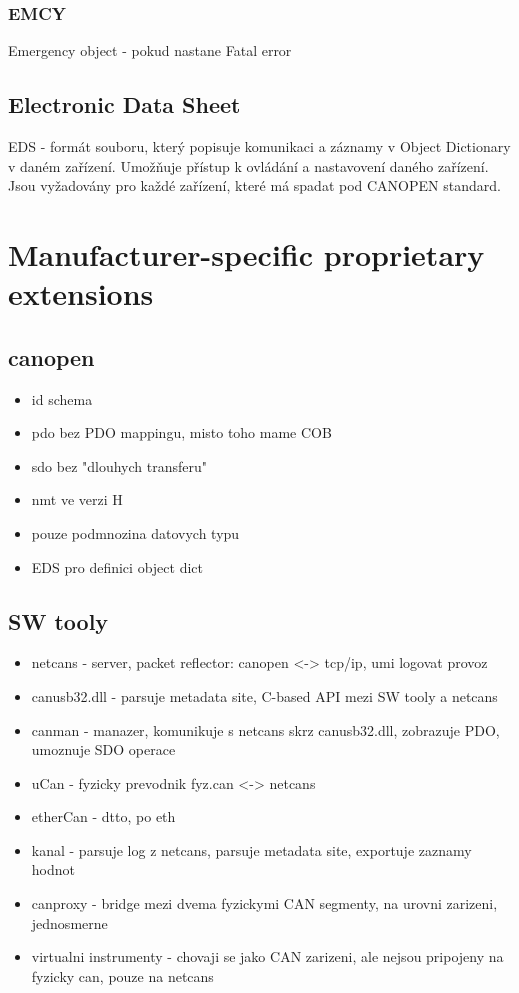 \documentclass[
  field=ainfk,
  biblatex,
  glossaries,
  index
]{kidiplom}
\begin{document}
\subsubsection{EMCY}
Emergency object - pokud nastane Fatal error

\subsection{Electronic Data Sheet}
EDS - formát souboru, který popisuje komunikaci a záznamy v Object Dictionary v daném zařízení. Umožňuje přístup k ovládání a nastavovení daného zařízení. Jsou vyžadovány pro každé zařízení, které má spadat pod CANOPEN standard.

\section{Manufacturer-specific proprietary extensions}

\subsection{canopen}

\begin{itemize}
    \item id schema
    \item pdo bez PDO mappingu, misto toho mame COB
    \item sdo bez "dlouhych transferu"
    \item nmt ve verzi H
    \item pouze podmnozina datovych typu
    \item EDS pro definici object dict
\end{itemize}

\subsection{SW tooly}

\begin{itemize}
    \item netcans - server, packet reflector: canopen <-> tcp/ip, umi logovat provoz 
    \item canusb32.dll - parsuje metadata site, C-based API mezi SW tooly a netcans
    \item canman - manazer, komunikuje s netcans skrz canusb32.dll, zobrazuje PDO, umoznuje SDO operace
    \item uCan - fyzicky prevodnik fyz.can <-> netcans
    \item etherCan - dtto, po eth
    \item kanal - parsuje log z netcans, parsuje metadata site, exportuje zaznamy hodnot 
    \item canproxy - bridge mezi dvema fyzickymi CAN segmenty, na urovni zarizeni, jednosmerne
    \item virtualni instrumenty - chovaji se jako CAN zarizeni, ale nejsou pripojeny na fyzicky can, pouze na netcans
\end{itemize}
\end{document}
